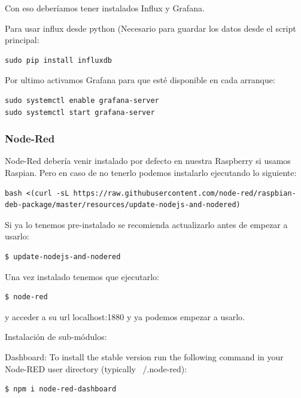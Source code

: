 \documentclass[12pt, a4paper, oneside, titlepage]{article}
\begin{document}
Con eso deberíamos tener instalados Influx y Grafana.

Para usar influx desde python (Necesario para guardar los datos desde el script principal:
 
\begin{lstlisting}
sudo pip install influxdb
 \end{lstlisting}
 

 Por ultimo activamos Grafana para que esté disponible en cada arranque:
 
\begin{lstlisting}
sudo systemctl enable grafana-server
sudo systemctl start grafana-server
\end{lstlisting}
 




\subsubsection{Node-Red}

Node-Red debería venir instalado por defecto en nuestra Raspberry si usamos Raspian. Pero en caso de no tenerlo podemos instalarlo ejecutando lo siguiente:

\begin{lstlisting}[frame=single]
bash <(curl -sL https://raw.githubusercontent.com/node-red/raspbian-deb-package/master/resources/update-nodejs-and-nodered)
\end{lstlisting}

Si ya lo tenemos pre-instalado se recomienda actualizarlo antes de empezar a usarlo:

\begin{lstlisting}[frame=single]
$ update-nodejs-and-nodered
\end{lstlisting}

Una vez instalado tenemos que ejecutarlo:
\begin{lstlisting}[frame=single]
$ node-red
\end{lstlisting}

y acceder a su url localhost:1880
y ya podemos empezar a usarlo.

Instalación de sub-módulos:

Dashboard:
To install the stable version run the following command in your Node-RED user directory (typically ~/.node-red):

\begin{lstlisting}[frame=single]
$ npm i node-red-dashboard
\end{lstlisting}
\end{document}
